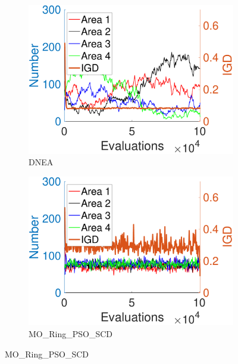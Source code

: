 \documentclass[conference]{IEEEtran}
\begin{document}
\begin{figure}[t!]
    \centering
    \begin{subfigure}[b]{.24\textwidth}
    \includegraphics[width=\linewidth]{Section5/dim2/Diversity/DNEA}
    \caption{DNEA}
    \end{subfigure}
    \begin{subfigure}[b]{.24\textwidth}
    \includegraphics[width=\linewidth]{Section5/dim2/Diversity/MO_Ring_PSO_SCD}
    \caption{MO\_Ring\_PSO\_SCD}
    \end{subfigure}
    

\end{figure}
\end{document}
